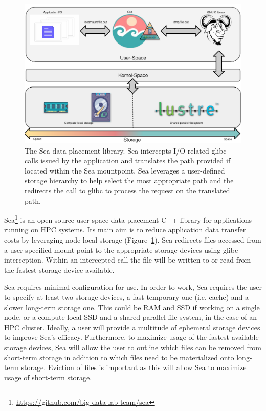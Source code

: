 \documentclass[10pt,journal,compsoc]{IEEEtran}
\begin{document}
\begin{figure}

    \centering
    \includegraphics[width=\columnwidth]{figures/seacomp-diagram.pdf}%
\caption{The Sea data-placement library. Sea intercepts I/O-related glibc calls
issued by the application and translates the path provided if located within the
Sea mountpoint. Sea leverages a user-defined storage hierarchy to help select
the most appropriate path and the redirects the call to glibc to process the
request on the translated path. }
\label{fig:sea-comp:diagram}
\end{figure}

Sea\footnote{\url{https://github.com/big-data-lab-team/sea}} is an open-source
user-space data-placement C++ library for applications running on HPC systems.
Its main aim is to reduce application data transfer costs by leveraging
node-local storage (Figure~\ref{fig:sea-comp:diagram}). Sea redirects files
accessed from a user-specified mount point to the appropriate storage devices
using glibc interception. Within an intercepted call the file will be written to
or read from the fastest storage device available. 


Sea requires minimal configuration for use. In order to work, Sea requires the
user to specify at least two storage devices, a fast temporary one (i.e. cache)
and a slower long-term storage one. This could be RAM and SSD if working on a
single node, or a compute-local SSD and a shared parallel file system, in the
case of an HPC cluster. Ideally, a user will provide a multitude of ephemeral
storage devices to improve Sea's efficacy. Furthermore, to maximize usage of the
fastest available storage devices, Sea will allow the user to outline which
files can be removed from short-term storage in addition to which files need to
be materialized onto long-term storage. Eviction of files is important as this
will allow Sea to maximize usage of short-term storage.
\end{document}
